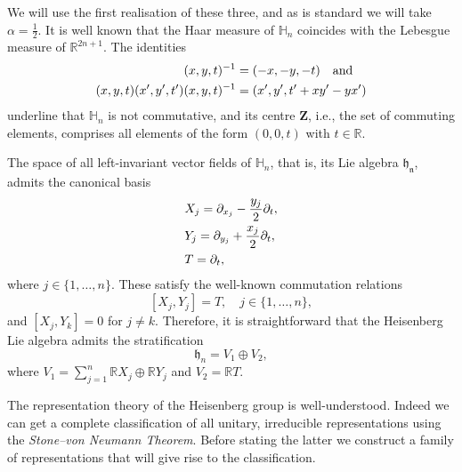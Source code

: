 \documentclass[12pt,oneside,a4paper]{book}
\numberwithin{equation}{section}     %
\theoremstyle{plain}
\theoremstyle{definition}
\newcommand{\R}{{\mathbb R}}
\begin{document}
We will use the first realisation of these three, and as is standard we will take $\alpha=\frac{1}{2}$. It is well known that the Haar measure of $\mathbb{H}_n$ coincides with the Lebesgue measure of $\R^{2n+1}$. The identities 
\begin{align}\notag
(x,y,t)^{-1}&=(-x,-y,-t)\quad\text{and}\\\notag
(x,y,t)(x',y',t')(x,y,t)^{-1}&=(x',y',t'+xy'-yx')
\end{align}
underline that $\mathbb{H}_n$ is not commutative, and its centre $\mathbf{Z}$, i.e., the set of commuting elements, comprises all elements of the form $(0,0,t)$ with $t\in \R$. 

The space of all left-invariant vector fields of $\mathbb{H}_n$, that is, its Lie algebra $\mathfrak{h_n}$, admits the canonical basis
\begin{align}\notag
&X_j=\partial_{x_j}-\frac{y_j}{2}\partial_t,\\\notag
&Y_j=\partial_{y_j}+\frac{x_j}{2}\partial_t,\\\notag
&T=\partial_t,
\end{align}
where $j\in\{1,\ldots,n\}$. These satisfy the well-known commutation relations
\begin{equation}
\label{EQ:commrelHeis}
[X_j,Y_j]=T,\quad j\in\{1,\ldots,n\},
\end{equation}
and $[X_j,Y_k]=0$ for $j\neq k$. Therefore, it is straightforward that the Heisenberg Lie algebra admits the stratification
\[
\mathfrak{h}_n=V_1\oplus V_2,
\]
where $V_1=\sum_{j=1}^n \R X_j \oplus \R Y_j$ and $V_2=\R T$.




The representation theory of the Heisenberg group is well-understood. Indeed we can get a complete classification of all unitary, irreducible representations using the \textit{Stone--von Neumann Theorem}. Before stating the latter we construct a family of representations that will give rise to the classification.
\end{document}
